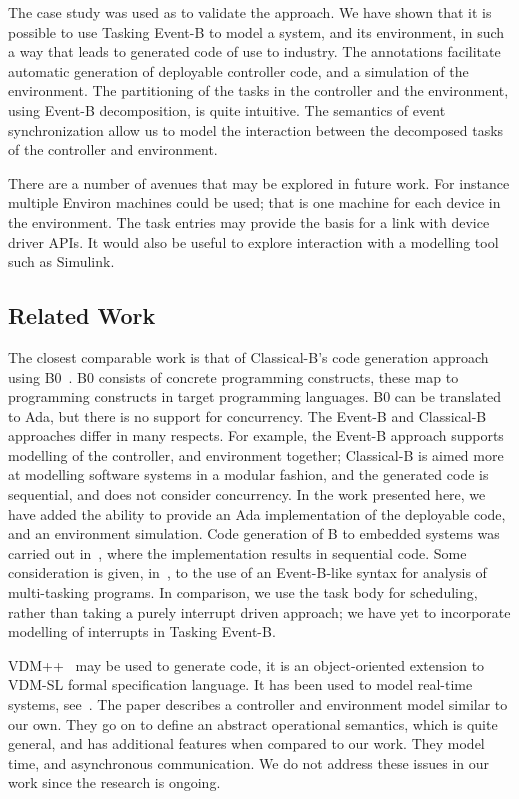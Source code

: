 The case study was used as to validate the approach. We have shown that it is possible to use Tasking Event-B to model a system, and its environment, in such a way that leads to generated code of use to industry. The annotations facilitate automatic generation of deployable controller code, and a simulation of the environment. The partitioning of the tasks in the controller and the environment, using Event-B decomposition, is quite intuitive. The semantics of event synchronization allow us to model the interaction between the decomposed tasks of the controller and environment. 

There are a number of avenues that may be explored in future work. For instance multiple Environ machines could be used; that is one machine for each device in the environment. The task entries may provide the basis for a link with device driver APIs. It would also be useful to explore interaction with a modelling tool such as Simulink.
%
\subsection{Related Work}
The closest comparable work is that of Classical-B's code generation approach~\cite{TheBBook} using B0~\cite{B0RefMan}. B0 consists of concrete programming constructs, these map to programming constructs in target programming languages. B0 can be translated to Ada, but there is no support for concurrency. The Event-B and Classical-B approaches differ in many respects. For example, the Event-B approach supports modelling of the controller, and environment together; Classical-B is aimed more at modelling software systems in a modular fashion, and the generated code is sequential, and does not consider concurrency. In the work presented here, we have added the ability to provide an Ada implementation of the deployable code, and an environment simulation. Code generation of B to embedded systems was carried out in~\cite{BertBPRV03}, where the implementation results in sequential code. Some consideration is given, in~\cite{StoddartCZ07}, to the use of an Event-B-like syntax for analysis of multi-tasking programs. In comparison, we use the task body for scheduling, rather than taking a purely interrupt driven approach; we have yet to incorporate modelling of interrupts in Tasking Event-B.

VDM++~\cite{CSK_LANG_MAN} may be used to generate code, it is an object-oriented extension to VDM-SL formal specification language. It has been used to model real-time systems, see~\cite{VerhoefLH06}. The paper describes a controller and environment model similar to our own. They go on to define an abstract operational semantics, which is quite general, and has additional features when compared to our work. They model time, and asynchronous communication. We do not address these issues in our work since the research is ongoing. 

